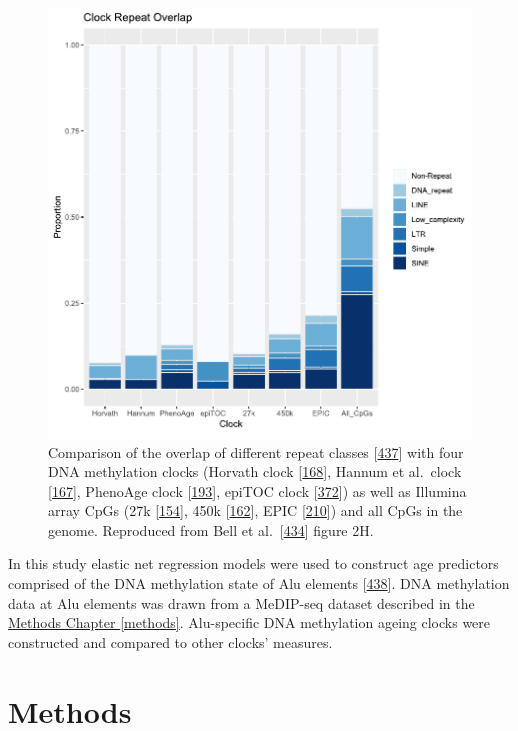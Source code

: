 \documentclass[
]{book}
\begin{document}
\begin{figure}

{\centering \includegraphics[width=0.6\linewidth]{./figs/Bell_2019_Clock_repeats_CpG} 

}

\caption{Comparison of the overlap of different repeat classes {[}\protect\hyperlink{ref-Smit2009}{437}{]} with four DNA methylation clocks (Horvath clock {[}\protect\hyperlink{ref-Horvath2013}{168}{]}, Hannum et al.~clock {[}\protect\hyperlink{ref-Hannum2013}{167}{]}, PhenoAge clock {[}\protect\hyperlink{ref-Levine2018}{193}{]}, epiTOC clock {[}\protect\hyperlink{ref-Yang2016}{372}{]}) as well as Illumina array CpGs (27k {[}\protect\hyperlink{ref-Bibikova2009}{154}{]}, 450k {[}\protect\hyperlink{ref-Bibikova2011}{162}{]}, EPIC {[}\protect\hyperlink{ref-Moran2015}{210}{]}) and all CpGs in the genome. Reproduced from Bell et al.~{[}\protect\hyperlink{ref-Bell2019}{434}{]} figure 2H.}\label{fig:clockRepeatCpGs}
\end{figure}



In this study elastic net regression models were used to construct age predictors comprised of the DNA methylation state of Alu elements {[}\protect\hyperlink{ref-Prive2019}{438}{]}.
DNA methylation data at Alu elements was drawn from a MeDIP-seq dataset described in the \protect\hyperlink{methods}{Methods Chapter \ref{methods}}.
Alu-specific DNA methylation ageing clocks were constructed and compared to other clocks' measures.

\newpage

\hypertarget{Alu-Methods}{%
\section{Methods}\label{Alu-Methods}}
\end{document}
